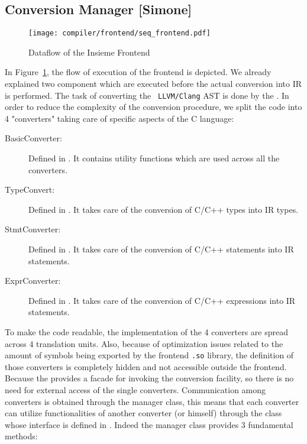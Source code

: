 \subsection{Conversion Manager [Simone]}
\label{sec:Insieme.Frontend.Convert}

\begin{figure}[tb]
	\centering
	\texttt{[image: compiler/frontend/seq\_frontend.pdf]}
	\caption{Dataflow of the Insieme Frontend}
	\label{fig:Frontend.Seq}
\end{figure}

In Figure~\ref{fig:Frontend.Seq}, the flow of execution of the frontend is
depicted. We already explained two component which are executed before the
actual conversion into IR is performed. The task of converting the {\tt
LLVM/Clang} AST is done by the . In order
to reduce the complexity of the conversion procedure, we split the code into 4
"converters" taking care of specific aspects of the C language:

\begin{description}

\item [BasicConverter:] Defined in . It
contains utility functions which are used across all the converters.

\item [TypeConvert:]  Defined in . It takes care
of the conversion of C/C++ types into IR types. 

\item [StmtConverter:] Defined in . It takes care
of the conversion of C/C++ statements into IR statements. 

\item[ExprConverter:] Defined in . It takes care
of the conversion of C/C++ expressions into IR statements. 

\end{description}

To make the code readable, the implementation of the 4 converters are spread
across 4 translation units. Also, because of optimization issues related to the
amount of symbols being exported by the frontend {\tt .so} library, the
definition of those converters is completely hidden and not accessible outside
the frontend.  Because the  provides a facade
for invoking the conversion facility, so there is no need for external access of
the single converters. Communication among converters is obtained through the
manager class, this means that each converter can utilize functionalities of
another converter (or himself) through the 
class whose interface is defined in .
Indeed the manager class provides 3 fundamental methods: 

